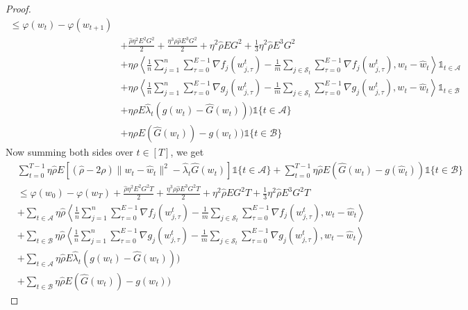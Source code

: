 \documentclass{article} %
\def\A{{\mathcal A}}
\def\B{{\mathcal B}}
\def\S{{\mathcal S}}
\begin{document}
\begin{proof}
\begin{align*}
        \leq \varphi(w_t) - \varphi(w_{t+1}) 
        \\
        & + \frac{\hat{\rho}\eta^2 E^2 G^2}{2} + \frac{\eta^3 \rho \hat{\rho} E^3 G^2}{2} + \eta^2 \hat{\rho} E G^2 + \frac{1}{3}\eta^2 \hat{\rho} E^3 G^2 
        \\
        &+ \eta \hat{\rho} \left\langle \frac{1}{n} \sum_{j=1}^{n} \sum_{\tau=0}^{E-1} \nabla f_j(w_{j,\tau}^t) 
        - \frac{1}{m} \sum_{j \in \S_t} \sum_{\tau=0}^{E-1} \nabla f_j(w_{j,\tau}^t), w_t - \hat{w}_t \right\rangle \mathds{1}_{t \in \A} \\
        & + \eta \hat{\rho} \left\langle \frac{1}{n} \sum_{j=1}^{n} \sum_{\tau=0}^{E-1} \nabla g_j(w_{j,\tau}^t) 
        - \frac{1}{m} \sum_{j \in \S_t} \sum_{\tau=0}^{E-1} \nabla g_j(w_{j,\tau}^t), w_t - \hat{w}_t \right\rangle \mathds{1}_{t \in \B}
        \\
        &+ \eta \hat{\rho} E \hat{\lambda}_t(g({w}_t) - \hat{G}(w_t)))\mathds{1}\{t \in \A\}
        \\
        &+ \eta \hat{\rho} E (\hat{G}(w_t)) - g({w}_t))\mathds{1}\{t \in \B\}
    \end{align*}
    Now summing both sides over $t \in [T]$, we get
    \begin{align*}
        &\sum_{t=0}^{T-1}\eta \hat{\rho} E[(\hat{\rho}-2\rho)\|w_t - \hat{w}_t\|^2 - \hat{\lambda}_t \hat{G}(w_t)]\mathds{1}\{t \in \A\} + \sum_{t=0}^{T-1}\eta \hat{\rho} E (\hat{G}(w_t) - g(\hat{w}_t))\mathds{1}\{t \in \B\}  
        \\
        & \leq \varphi(w_0) - \varphi(w_{T}) + \frac{\hat{\rho}\eta^2 E^2 G^2 T}{2} + \frac{\eta^3 \rho \hat{\rho} E^3 G^2 T}{2} + \eta^2 \hat{\rho} E G^2 T + \frac{1}{3}\eta^2 \hat{\rho} E^3 G^2 T
        \\
        &+ \sum_{t \in \A} \eta \hat{\rho}\left\langle \frac{1}{n} \sum_{j=1}^{n} \sum_{\tau=0}^{E-1} \nabla f_j(w_{j,\tau}^t) 
        - \frac{1}{m} \sum_{j \in \S_t} \sum_{\tau=0}^{E-1} \nabla f_j(w_{j,\tau}^t), w_t - \hat{w}_t \right\rangle \\
        & + \sum_{t\in \B} \eta \hat{\rho} \left\langle \frac{1}{n} \sum_{j=1}^{n} \sum_{\tau=0}^{E-1} \nabla g_j(w_{j,\tau}^t) 
        - \frac{1}{m} \sum_{j \in \S_t} \sum_{\tau=0}^{E-1} \nabla g_j(w_{j,\tau}^t), w_t - \hat{w}_t \right\rangle 
        \\
        & + \sum_{t\in \A}\eta \hat{\rho} E \hat{\lambda}_t(g({w}_t) - \hat{G}(w_t)))
        \\
        &+ \sum_{t\in \B}\eta \hat{\rho} E (\hat{G}(w_t)) - g({w}_t))

\end{align*}
\end{proof}
\end{document}

